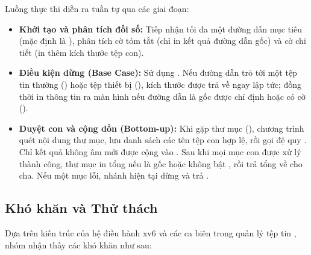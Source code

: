 \noindent Luồng thực thi diễn ra tuần tự qua các giai đoạn:
\begin{itemize}[noitemsep, topsep=2pt]
    \item \textbf{Khởi tạo và phân tích đối số:} Tiếp nhận tối đa một đường dẫn mục tiêu (mặc định là ), phân tích cờ tóm tắt  (chỉ in kết quả đường dẫn gốc) và cờ chi tiết  (in thêm kích thước tệp con).
    \item \textbf{Điều kiện dừng (Base Case):} Sử dụng . Nếu đường dẫn trỏ tới một tệp tin thường () hoặc tệp thiết bị (), kích thước  được trả về ngay lập tức; đồng thời in thông tin ra màn hình nếu đường dẫn là gốc được chỉ định hoặc có cờ  ().
    \item \textbf{Duyệt con và cộng dồn (Bottom-up):} Khi gặp thư mục (), chương trình quét nội dung thư mục, lưu danh sách các tên tệp con hợp lệ, rồi gọi đệ quy . Chỉ kết quả không âm mới được cộng vào . Sau khi mọi mục con được xử lý thành công, thư mục in tổng nếu là gốc hoặc không bật , rồi trả tổng về cho cha. Nếu một mục lỗi, nhánh hiện tại dừng và trả .
\end{itemize}

\subsection{Khó khăn và Thử thách}
Dựa trên kiến trúc của hệ điều hành xv6 và các ca biên trong quản lý tệp tin \cite{xv6book}, nhóm nhận thấy các khó khăn như sau:

